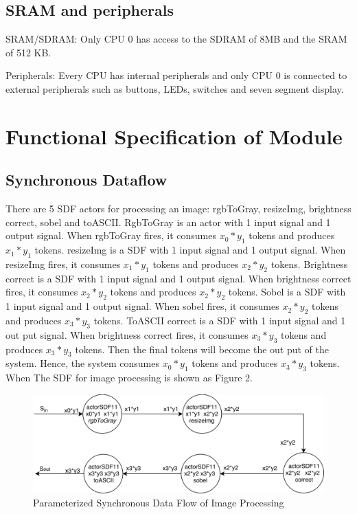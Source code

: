 \documentclass[conference,compsoc]{IEEEtran}
\begin{document}
\subsection{SRAM and peripherals}
\par SRAM/SDRAM: Only CPU 0 has access to the SDRAM
of 8MB and the SRAM of 512 KB.
\par Peripherals: Every CPU has internal peripherals and only
CPU 0 is connected to external peripherals such as buttons,
LEDs, switches and seven segment display.
\section{Functional Specification of Module}
  \subsection{Synchronous Dataflow}
  There are 5 SDF actors for processing an image: rgbToGray, resizeImg, brightness correct, sobel and toASCII.
  RgbToGray is an actor with 1 input signal and 1 output signal.
  When rgbToGray fires, it consumes $x_0 * y_1$ tokens and produces $x_1 * y_1$ tokens.
  resizeImg is a SDF with 1 input signal and 1 output signal. 
  When resizeImg fires, it consumes $x_1 * y_1$ tokens and produces $x_2 * y_2$ tokens.
  Brightness correct is a SDF with 1 input signal and 1 output signal. 
  When brightness correct fires, it consumes $x_2 * y_2$ tokens and produces $x_2 * y_2$ tokens.
  Sobel is a SDF with 1 input signal and 1 output signal. 
  When sobel fires, it consumes $x_2 * y_2$ tokens and produces $x_3 * y_3$ tokens.
  ToASCII correct is a SDF with 1 input signal and 1 out put signal. 
  When brightness correct fires, it consumes $x_3 * y_3$ tokens and produces $x_3 * y_3$ tokens.
  Then the final tokens will become the out put of the system. Hence, the system consumes $x_0 * y_1$ tokens and produces $x_3 * y_3$ tokens.
  When The SDF for image processing is shown as Figure 2.
  \begin{figure}[h]
    \centering
    \includegraphics[width=15cm]{sdf.eps}
    \caption{Parameterized Synchronous Data Flow of Image Processing}	
    \end{figure}
    
\end{document}
